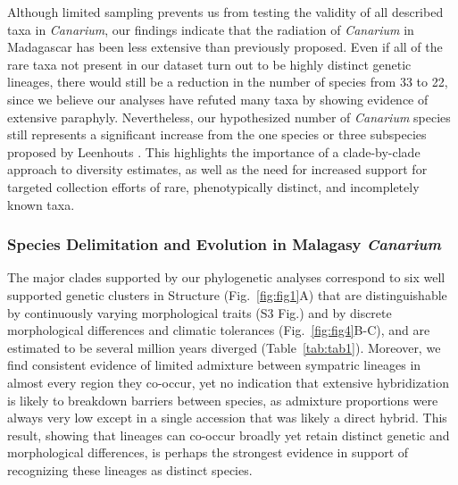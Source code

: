 \documentclass[10pt,letterpaper]{article}
\begin{document}
Although limited sampling prevents us from testing the validity of all described taxa in \emph{Canarium}, our findings indicate that the radiation of \emph{Canarium} in Madagascar has been less extensive than previously proposed. Even if all of the rare taxa not present in our dataset turn out to be highly distinct genetic lineages, there would still be a reduction in the number of species from 33 to 22, since we believe our analyses have refuted many taxa by showing evidence of extensive paraphyly. Nevertheless, our hypothesized number of \emph{Canarium} species still represents a significant increase from the one species or three subspecies proposed by Leenhouts \cite{leenhouts_revision_1959}. This highlights the importance of a clade-by-clade approach to diversity estimates, as well as the need for increased support for targeted collection efforts of rare, phenotypically distinct, and incompletely known taxa. 

\subsubsection*{Species Delimitation and Evolution in Malagasy \emph{Canarium}}
The major clades supported by our phylogenetic analyses correspond to six well supported genetic clusters in Structure (Fig.~\ref{fig:fig1}A) that are distinguishable by continuously varying morphological traits (S3 Fig.) %
and by discrete morphological differences and climatic tolerances (Fig.~\ref{fig:fig4}B-C), and are estimated to be several million years diverged (Table~\ref{tab:tab1}). Moreover, we find consistent evidence of limited admixture between sympatric lineages in almost every region they co-occur, yet no indication that extensive hybridization is likely to breakdown barriers between species, as admixture proportions were always very low except in a single accession that was likely a direct hybrid. This result, showing that lineages can co-occur broadly yet retain distinct genetic and morphological differences, is perhaps the strongest evidence in support of recognizing these lineages as distinct species.




\end{document}
